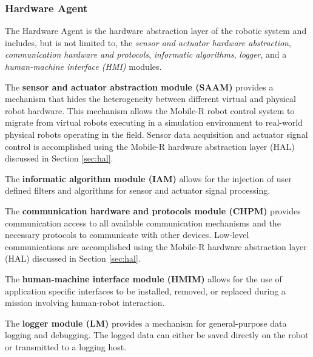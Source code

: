     \subsubsection{Hardware Agent}
      The Hardware Agent is the hardware abstraction layer of the robotic 
        system and includes, but is not limited to, the \textit{sensor and 
       actuator hardware abstraction}, \textit{communication hardware and 
        protocols}, \textit{informatic algorithms}, \textit{logger}, and
        a \textit{human-machine interface (HMI)} modules.

      The \textbf{sensor and actuator abstraction module (SAAM)} provides a 
       mechanism that hides the heterogeneity between different virtual and
        physical robot hardware.
      This mechanism allows the Mobile-R robot control system to migrate from
        virtual robots executing in a simulation environment to real-world
        physical robots operating in the field.
      Sensor data acquisition and actuator signal control is accomplished
        using the Mobile-R hardware abstraction layer (HAL) discussed
        in Section \ref{sec:hal}.
       
      The \textbf{informatic algorithm module (IAM)} allows for the injection 
        of user defined filters and algorithms for sensor and actuator
        signal processing.

      The \textbf{communication hardware and protocols module (CHPM)} provides 
        communication access to all available communication mechanisms and the 
        necessary protocols to communicate with other devices.
      Low-level communications are accomplished using the Mobile-R hardware 
        abstraction layer (HAL) discussed in Section \ref{sec:hal}.

      The \textbf{human-machine interface module (HMIM)} allows for the use of
        application specific interfaces to be installed, removed, or replaced
        during a mission involving human-robot interaction.

      The \textbf{logger module (LM)} provides a mechanism for general-purpose 
        data logging and debugging.
      The logged data can either be saved directly on the robot or transmitted
        to a logging host.

